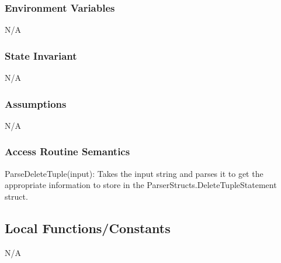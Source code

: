 \documentclass[12pt]{article}
\begin{document}
\subsubsection{Environment Variables}
N/A

\subsubsection{State Invariant}
N/A

\subsubsection{Assumptions}
N/A

\subsubsection{Access Routine Semantics}
{\color{red} \noindent ParseDeleteTuple(input): Takes the input string and parses it to get the appropriate information to store in the ParserStructs.DeleteTupleStatement struct.\\}

\subsection{Local Functions/Constants}
N/A
\medskip

\newpage
\end{document}

